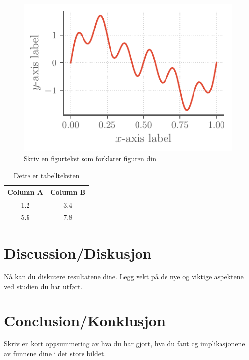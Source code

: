 \documentclass[a4paper, 10pt]{article}
\begin{document}
\begin{figure}[h]
\centering
\includegraphics{example_figure}
\caption{Skriv en figurtekst som forklarer figuren din}
\label{fig:label1}
\end{figure}

\begin{table}[h]
\centering
\caption{Dette er tabellteksten}
\begin{tabular}{c|c}
    \hline
    Column A & Column B \\\hline
    1.2      & 3.4      \\
    5.6      & 7.8      \\\hline
\end{tabular}

\label{tab:label}
\end{table}

\section{Discussion/Diskusjon}
Nå kan du diskutere resultatene dine. Legg vekt på de nye og viktige
aspektene ved studien du har utført.

\section{Conclusion/Konklusjon}
Skriv en kort oppsummering av hva du har gjort, hva du fant og implikasjonene av funnene dine i det store bildet.




\end{document}
